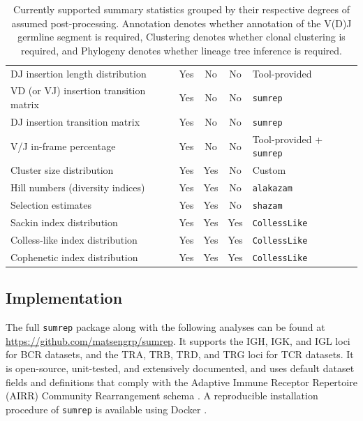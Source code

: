 \documentclass{article}
\begin{document}
\begin{table}
{\begin{tabular}{l|c|c|c|l}
DJ insertion length distribution & Yes & No & No & Tool-provided \\
VD (or VJ) insertion transition matrix & Yes & No & No & \texttt{sumrep} \\
DJ insertion transition matrix & Yes & No & No & \texttt{sumrep} \\
V/J in-frame percentage & Yes & No & No & Tool-provided + \texttt{sumrep} \\
\hline
Cluster size distribution & Yes & Yes & No & Custom \\
Hill numbers (diversity indices) & Yes & Yes & No & \texttt{alakazam} \\
Selection estimates & Yes & Yes & No & \texttt{shazam} \\
\hline
    Sackin index distribution & Yes & Yes & Yes & \texttt{CollessLike} \cite{Mir2018-lk} \\
Colless-like index distribution & Yes & Yes & Yes & \texttt{CollessLike} \\
Cophenetic index distribution & Yes & Yes & Yes & \texttt{CollessLike} \\
\end{tabular}
}
\caption{Currently supported summary statistics grouped by their respective degrees of assumed post-processing. Annotation denotes whether annotation of the V(D)J germline segment is required, Clustering denotes whether clonal clustering is required, and Phylogeny denotes whether lineage tree inference is required.}
\label{tab:SummaryStatistics}
\end{table}

\subsection*{Implementation}
The full \texttt{sumrep} package along with the following analyses can be found at \url{https://github.com/matsengrp/sumrep}.
It supports the IGH, IGK, and IGL loci for BCR datasets, and the TRA, TRB, TRD, and TRG loci for TCR datasets.
It is open-source, unit-tested, and extensively documented, and uses default dataset fields and definitions that comply with the Adaptive Immune Receptor Repertoire (AIRR) Community Rearrangement schema \cite{Vander_Heiden2018-mu}.
A reproducible installation procedure of \texttt{sumrep} is available using Docker \cite{Boettiger2015-ya}.
\end{document}
